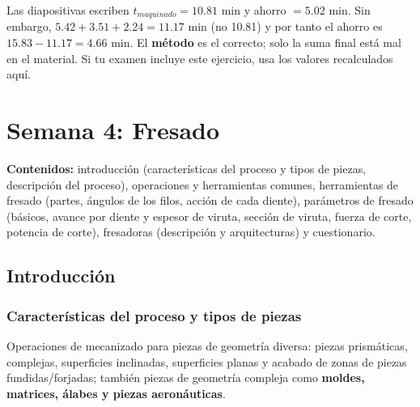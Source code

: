\documentclass[12pt,a4paper]{article}
\begin{document}
\begin{aviso}
	Las diapositivas escriben $t_{maquinado} = 10.81$ min y ahorro $= 5.02$ min.
	Sin embargo, $5.42 + 3.51 + 2.24 = 11.17$ min (no 10.81) y por tanto el ahorro
	es $15.83 - 11.17 = 4.66$ min. El \textbf{método} es el correcto; solo la suma
	final está mal en el material. Si tu examen incluye este ejercicio, usa los
	valores recalculados aquí.
\end{aviso}

\newpage
\section{Semana 4: Fresado}

\textbf{Contenidos:} introducción (características del proceso y tipos de
piezas, descripción del proceso), operaciones y herramientas comunes,
herramientas de fresado (partes, ángulos de los filos, acción de cada diente),
parámetros de fresado (básicos, avance por diente y espesor de viruta, sección
de viruta, fuerza de corte, potencia de corte), fresadoras (descripción y
arquitecturas) y cuestionario.

\subsection{Introducción}

\subsubsection{Características del proceso y tipos de piezas}
Operaciones de mecanizado para piezas de geometría diversa: piezas prismáticas,
complejas, superficies inclinadas, superficies planas y acabado de zonas de
piezas fundidas/forjadas; también piezas de geometría compleja como
\textbf{moldes, matrices, álabes y piezas aeronáuticas}.
\end{document}
